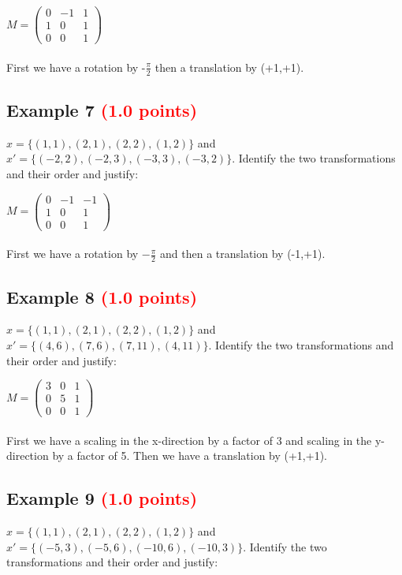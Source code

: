 \documentclass[answers]{exam}
\newcommand{\mypoints}[1]{\textcolor{red}{(#1 points)}}
\begin{document}
\begin{solution}
$
M = \begin{pmatrix}
0 & -1 & 1\\
1 & 0 & 1\\
0 & 0 & 1
\end{pmatrix}
$
\\\\
First we have a rotation by -$\frac{\pi}{2}$ then a translation by (+1,+1).
\end{solution}

\subsection{Example 7 \mypoints{1.0}}
$x = \{(1,1), (2,1), (2,2), (1,2)\}$ and $x' = \{(-2,2), (-2,3), (-3,3), (-3,2)\}$. Identify the two transformations and their order and justify:

\begin{solution}
$
M = \begin{pmatrix}
0 & -1 & -1\\
1 & 0 & 1\\
0 & 0 & 1
\end{pmatrix}
$
\\\\
First we have a rotation by $-\frac{\pi}{2}$ and then a translation by (-1,+1).
\end{solution}

\subsection{Example 8 \mypoints{1.0}}
$x = \{(1,1), (2,1), (2,2), (1,2)\}$ and $x' = \{(4, 6), (7,6), (7,11), (4,11)\}$. Identify the two transformations and their order and justify:

\begin{solution}
$
M = \begin{pmatrix}
3 & 0 & 1\\
0 & 5 & 1\\
0 & 0 & 1
\end{pmatrix}
$
\\\\
First we have a scaling in the x-direction by a factor of 3 and scaling in the y-direction by a factor of 5. Then we have a translation by (+1,+1).
\end{solution}

\subsection{Example 9 \mypoints{1.0}}
$x = \{(1,1), (2,1), (2,2), (1,2)\}$ and $x' = \{(-5,3), (-5,6), (-10,6), (-10,3)\}$. Identify the two transformations and their order and justify:
\end{document}
